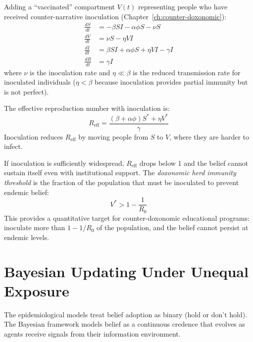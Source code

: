 \begin{model}
\label{mod:sirv}
Adding a ``vaccinated'' compartment $V(t)$ representing people who have received counter-narrative inoculation (Chapter~\ref{ch:counter-doxonomic}):
\begin{align}
  \frac{dS}{dt} &= -\beta S I - \alpha \phi S - \nu S \\
  \frac{dV}{dt} &= \nu S - \eta V I \\
  \frac{dI}{dt} &= \beta S I + \alpha \phi S + \eta V I - \gamma I \\
  \frac{dR}{dt} &= \gamma I
\end{align}
where $\nu$ is the inoculation rate and $\eta \ll \beta$ is the reduced transmission rate for inoculated individuals ($\eta < \beta$ because inoculation provides partial immunity but is not perfect).

The effective reproduction number with inoculation is:
\[
  R_{\text{eff}} = \frac{(\beta + \alpha\phi) S^* + \eta V^*}{\gamma}
\]
Inoculation reduces $R_{\text{eff}}$ by moving people from $S$ to $V$, where they are harder to infect.
\end{model}

\begin{remark}
\label{rem:herd-immunity}
If inoculation is sufficiently widespread, $R_{\text{eff}}$ drops below 1 and the belief cannot sustain itself even with institutional support.
The \emph{doxonomic herd immunity threshold} is the fraction of the population that must be inoculated to prevent endemic belief:
\[
  V^* > 1 - \frac{1}{R_0}
\]
This provides a quantitative target for counter-doxonomic educational programs: inoculate more than $1 - 1/R_0$ of the population, and the belief cannot persist at endemic levels.
\end{remark}


\section{Bayesian Updating Under Unequal Exposure}
\label{sec:ch11-bayesian}

The epidemiological models treat belief adoption as binary (hold or don't hold).
The Bayesian framework models belief as a continuous credence that evolves as agents receive signals from their information environment.

